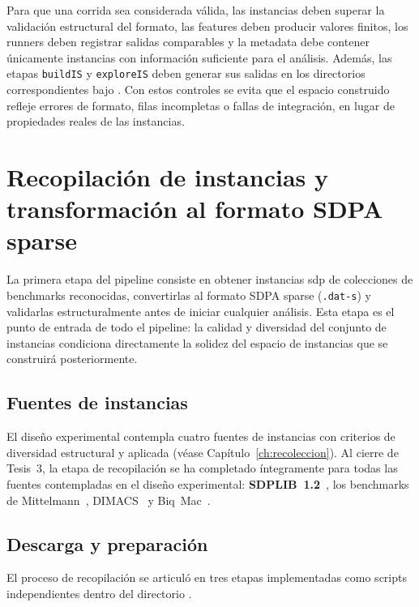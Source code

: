 Para que una corrida sea considerada válida, las instancias deben superar la
validación estructural del formato, las features deben producir valores finitos, los
runners deben registrar salidas comparables y la metadata debe contener únicamente
instancias con información suficiente para el análisis.
Además, las etapas \texttt{buildIS} y \texttt{exploreIS} deben generar sus salidas
en los directorios correspondientes bajo .
Con estos controles se evita que el espacio construido refleje errores de formato,
filas incompletas o fallas de integración, en lugar de propiedades reales de las
instancias.

\section{Recopilación de instancias y transformación al formato SDPA sparse}
\label{sec:avance_instancias}

La primera etapa del pipeline consiste en obtener instancias \acrshort{sdp} de colecciones
de benchmarks reconocidas, convertirlas al formato SDPA sparse (\texttt{.dat-s}) y
validarlas estructuralmente antes de iniciar cualquier análisis.
Esta etapa es el punto de entrada de todo el pipeline: la calidad y diversidad del
conjunto de instancias condiciona directamente la solidez del espacio de instancias que
se construirá posteriormente.

\subsection{Fuentes de instancias}
\label{subsec:avance_fuentes}

El diseño experimental contempla cuatro fuentes de instancias con criterios de diversidad
estructural y aplicada (véase Capítulo~\ref{ch:recoleccion}).
Al cierre de Tesis~3, la etapa de recopilación se ha completado íntegramente para todas
las fuentes contempladas en el diseño experimental: \textbf{SDPLIB~1.2}~\cite{borchersSDPLIB12Library1999},
los benchmarks de Mittelmann~\cite{PlatoasueduFtpSparse_sdphtml},
DIMACS~\cite{DIMACSLibraryMixeda} y Biq~Mac~\cite{BiqMacLibrarya}.

\subsection{Descarga y preparación}
\label{subsec:avance_descarga}

El proceso de recopilación se articuló en tres etapas implementadas como scripts
independientes dentro del directorio .

